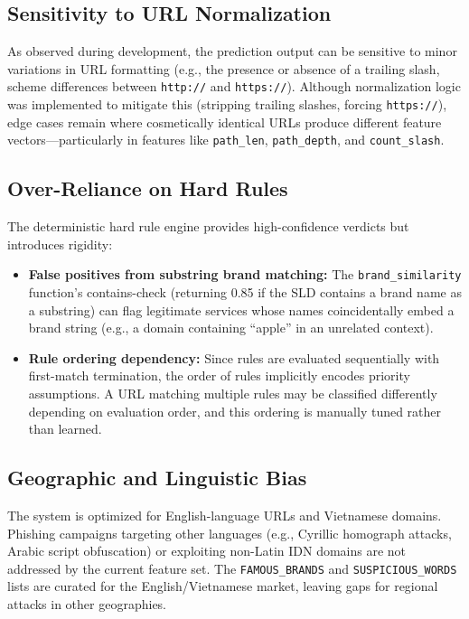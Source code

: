 \documentclass[12pt,a4paper]{article}
\begin{document}
\subsection{Sensitivity to URL Normalization}

As observed during development, the prediction output can be sensitive to minor variations in URL formatting (e.g., the presence or absence of a trailing slash, scheme differences between \texttt{http://} and \texttt{https://}). Although normalization logic was implemented to mitigate this (stripping trailing slashes, forcing \texttt{https://}), edge cases remain where cosmetically identical URLs produce different feature vectors---particularly in features like \texttt{path\_len}, \texttt{path\_depth}, and \texttt{count\_slash}.

\subsection{Over-Reliance on Hard Rules}

The deterministic hard rule engine provides high-confidence verdicts but introduces rigidity:
\begin{itemize}
    \item \textbf{False positives from substring brand matching:} The \texttt{brand\_similarity} function's contains-check (returning 0.85 if the SLD contains a brand name as a substring) can flag legitimate services whose names coincidentally embed a brand string (e.g., a domain containing ``apple'' in an unrelated context).
    \item \textbf{Rule ordering dependency:} Since rules are evaluated sequentially with first-match termination, the order of rules implicitly encodes priority assumptions. A URL matching multiple rules may be classified differently depending on evaluation order, and this ordering is manually tuned rather than learned.
\end{itemize}

\subsection{Geographic and Linguistic Bias}

The system is optimized for English-language URLs and Vietnamese domains. Phishing campaigns targeting other languages (e.g., Cyrillic homograph attacks, Arabic script obfuscation) or exploiting non-Latin IDN domains are not addressed by the current feature set. The \texttt{FAMOUS\_BRANDS} and \texttt{SUSPICIOUS\_WORDS} lists are curated for the English/Vietnamese market, leaving gaps for regional attacks in other geographies.
\end{document}
